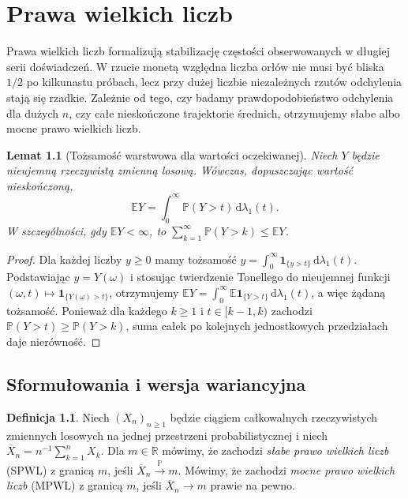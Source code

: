 \documentclass[11pt,a4paper,oneside]{report}
\numberwithin{equation}{chapter}
\theoremstyle{plain}
\newtheorem{lemat}[twierdzenie]{Lemat}
\theoremstyle{definition}
\newtheorem{definicja}{Definicja}[chapter]
\theoremstyle{remark}
\newcommand{\R}{\mathbb{R}}
\newcommand{\Prob}{\mathbb{P}}
\newcommand{\E}{\mathbb{E}}
\newcommand{\ind}[1]{\mathbf{1}_{#1}}
\newcommand{\dd}{\mathrm{d}}
\begin{document}

\chapter{Prawa wielkich liczb}
\label{ch:lln}

Prawa wielkich liczb formalizują stabilizację częstości
obserwowanych w długiej serii doświadczeń. W rzucie monetą
względna liczba orłów nie musi być bliska $1/2$ po
kilkunastu próbach, lecz przy dużej liczbie niezależnych
rzutów odchylenia stają się rzadkie. Zależnie od tego,
czy badamy prawdopodobieństwo odchylenia dla dużych $n$,
czy całe nieskończone trajektorie średnich, otrzymujemy
słabe albo mocne prawo wielkich liczb.

\begin{lemat}[Tożsamość warstwowa dla wartości oczekiwanej]
Niech $Y$ będzie nieujemną rzeczywistą zmienną losową.
Wówczas, dopuszczając wartość nieskończoną,
\[
\E Y=\int_0^\infty \Prob(Y>t)\,\dd\lambda_1(t).
\]
W szczególności, gdy $\E Y<\infty$, to
$\sum_{k=1}^\infty\Prob(Y>k)\leq\E Y$.
\end{lemat}
\begin{proof}
Dla każdej liczby $y\geq0$ mamy tożsamość
$y=\int_0^\infty\ind{\{y>t\}}\,\dd\lambda_1(t)$.
Podstawiając $y=Y(\omega)$ i stosując twierdzenie
Tonellego do nieujemnej funkcji
$(\omega,t)\mapsto\ind{\{Y(\omega)>t\}}$,
otrzymujemy
$\E Y=\int_0^\infty \E\ind{\{Y>t\}}\,\dd\lambda_1(t)$,
a więc żądaną tożsamość. Ponieważ dla każdego $k\geq1$
i $t\in[k-1,k)$ zachodzi
$\Prob(Y>t)\geq\Prob(Y>k)$, suma całek po
kolejnych jednostkowych przedziałach daje nierówność.
\end{proof}

\section{Sformułowania i wersja wariancyjna}

\begin{definicja}
Niech $(X_n)_{n\geq1}$ będzie ciągiem całkowalnych
rzeczywistych zmiennych losowych na jednej przestrzeni
probabilistycznej i niech
$\overline X_n=n^{-1}\sum_{k=1}^nX_k$.
Dla $m\in\R$ mówimy, że zachodzi \emph{słabe prawo
wielkich liczb} (SPWL) z granicą $m$, jeśli
$\overline X_n\xrightarrow{\Prob}m$.
Mówimy, że zachodzi \emph{mocne prawo wielkich liczb}
(MPWL) z granicą $m$, jeśli
$\overline X_n\to m$ prawie na pewno.
\end{definicja}
\end{document}

